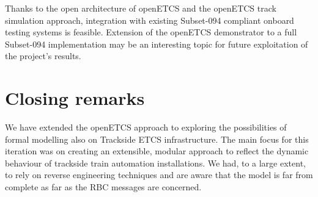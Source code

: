\documentclass{template/openetcs_article}
\begin{document}
Thanks to the open architecture of openETCS and the openETCS track simulation approach, integration with existing Subset-094 compliant onboard testing systems is feasible. 
Extension of the openETCS demonstrator to a full Subset-094 implementation may be an interesting topic for future exploitation of the project's results. 

\section{Closing remarks}

We have extended the openETCS approach to exploring the possibilities of formal modelling also on Trackside ETCS infrastructure. The main focus for this iteration was on creating an extensible, modular approach to reflect the dynamic behaviour of trackside train automation installations.\newline
We had, to a large extent, to rely on reverse engineering techniques and are aware that the model is far from complete as far as the RBC messages are concerned. 





\nocite{*}



\end{document}
